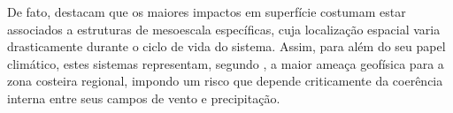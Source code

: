 %
De fato, \citet{eisenstein2023identification} destacam que os maiores impactos em superfície costumam estar associados a estruturas de mesoescala específicas, cuja localização espacial varia drasticamente durante o ciclo de vida do sistema.
%
Assim, para além do seu papel climático, estes sistemas representam, segundo \citet{gramcianinov2023impact}, a maior ameaça geofísica para a zona costeira regional, impondo um risco que depende criticamente da coerência interna entre seus campos de vento e precipitação.



